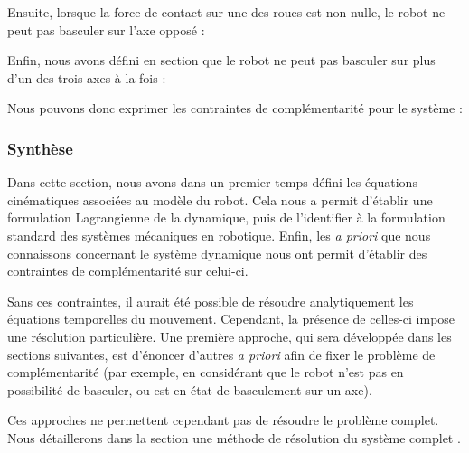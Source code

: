 				Ensuite, lorsque la force de contact sur une des roues est non-nulle, le robot ne peut pas basculer sur l'axe opposé :
				
				Enfin, nous avons défini en section  que le robot ne peut pas basculer sur plus d'un des trois axes à la fois :
				
				Nous pouvons donc exprimer les contraintes de complémentarité pour le système :
				
			\subsubsection{Synthèse}
			
				Dans cette section, nous avons dans un premier temps défini les équations cinématiques associées au modèle du robot.
				Cela nous a permit d'établir une formulation Lagrangienne de la dynamique, puis de l'identifier à la formulation standard des systèmes mécaniques en robotique.
				Enfin, les \textit{a priori} que nous connaissons concernant le système dynamique nous ont permit d'établir des contraintes de complémentarité sur celui-ci.
				
				
				
				Sans ces contraintes, il aurait été possible de résoudre analytiquement les équations temporelles du mouvement. Cependant, la présence de celles-ci impose une résolution particulière.
				Une première approche, qui sera développée dans les sections suivantes, est d'énoncer d'autres \textit{a priori} afin de fixer le problème de complémentarité
				(par exemple, en considérant que le robot n'est pas en possibilité de basculer, ou est en état de basculement sur un axe). 
				
				Ces approches ne permettent cependant pas de résoudre le problème complet. 
				Nous détaillerons dans la section  une méthode de résolution du système complet .
		

